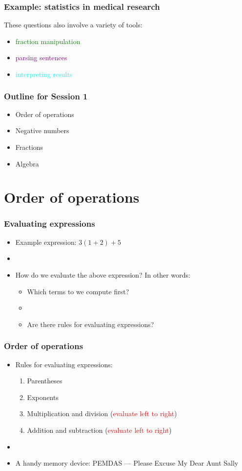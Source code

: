\documentclass[11pt]{beamer}
\newcommand{\myframe}[1]{\begin{frame} \frametitle{#1}}
\newenvironment{spaceitemize}
{ \begin{itemize}
    \setlength{\itemsep}{10pt}
    \setlength{\parskip}{0pt}
    \setlength{\parsep}{0pt}     }
{ \end{itemize}                  }
\begin{document}
\myframe{Example: statistics in medical research}
These questions also involve a variety of tools:
\begin{spaceitemize}
\item \textcolor{green}{fraction manipulation}
\item \textcolor{purple}{parsing sentences}
\item \textcolor{cyan}{interpreting results}
\end{spaceitemize}
\end{frame}

\myframe{Outline for Session 1}
\begin{spaceitemize}
\item Order of operations
\item Negative numbers 
\item Fractions
\item Algebra
\end{spaceitemize}
\end{frame}

\section{Order of operations}
\myframe{Evaluating expressions}
\begin{itemize}
\item Example expression: $3(1 + 2) + 5$
\item[]
\item How do we evaluate the above expression? In other words:
\begin{itemize}
\item Which terms to we compute first?
\item[]
\item Are there rules for evaluating expressions?
\end{itemize}
\end{itemize}
\end{frame}

\myframe{Order of operations}
\begin{itemize}
\item Rules for evaluating expressions:
\begin{enumerate}
\item Parentheses
\item Exponents
\item Multiplication and division (\textcolor{red}{evaluate left to right})
\item Addition and subtraction (\textcolor{red}{evaluate left to right})
\end{enumerate}
\item[]
\item A handy memory device: PEMDAS --- Please Excuse My Dear Aunt Sally
\end{itemize}
\end{frame}
\end{document}
